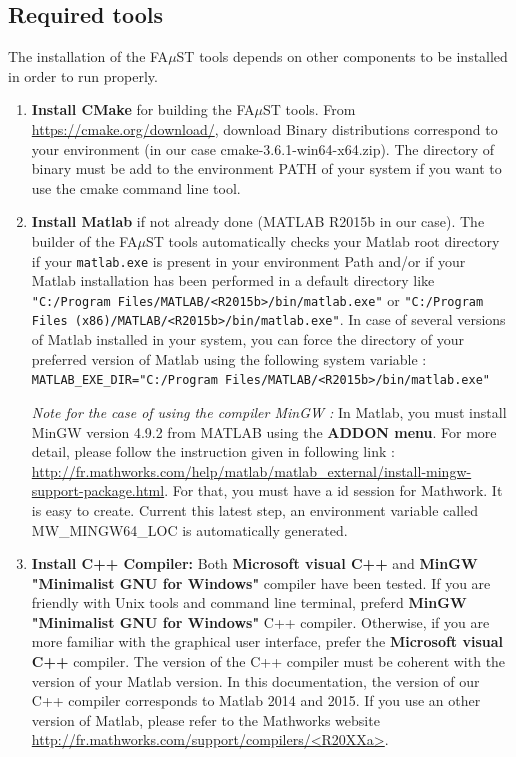 \subsection{Required tools}\label{sec:WinRequired}
The installation of the FA$\mu$ST tools depends on other components to be installed in order to run properly. 
\begin{enumerate}

\item \textbf{Install CMake} for building the FA$\mu$ST tools. 
From \url{https://cmake.org/download/}, download Binary distributions correspond to your environment (in our case  cmake-3.6.1-win64-x64.zip). The directory of binary must be add to the environment PATH of your system if you want to use the cmake command line tool. 


\item \textbf{Install Matlab} if not already done (MATLAB R2015b in our case). The builder of the FA$\mu$ST tools automatically checks your Matlab root directory if your \texttt{matlab.exe} is present in your environment Path and/or if your Matlab installation has been performed in a default directory like \texttt{"C:/Program Files/MATLAB/<R2015b>/bin/matlab.exe"} or \texttt{"C:/Program Files (x86)/MATLAB/<R2015b>/bin/matlab.exe"}. In case of several versions of Matlab installed in your system, you can force the directory of your preferred version of Matlab using the following system variable : \\
\texttt{MATLAB\_EXE\_DIR="C:/Program Files/MATLAB/<R2015b>/bin/matlab.exe"}

\textit{Note for the case of using the compiler MinGW :} In Matlab, you must install MinGW version 4.9.2 from MATLAB using the \textbf{ADDON menu}. For more detail, please follow the instruction given in following link :  
\url{http://fr.mathworks.com/help/matlab/matlab_external/install-mingw-support-package.html}. For that, you must have a id session for Mathwork. It is easy to create. 
Current this latest step, an environment variable called MW\_MINGW64\_LOC is automatically generated. 

\item \textbf{Install C++ Compiler:} Both \textbf{Microsoft visual C++} and \textbf{MinGW "Minimalist GNU for Windows"} compiler have been tested. If you are friendly with Unix tools and command line terminal, preferd \textbf{MinGW "Minimalist GNU for Windows"} C++ compiler. Otherwise, if you are more familiar with the graphical user interface, prefer the \textbf{Microsoft visual C++} compiler. The version of the C++ compiler must be coherent with the version of your Matlab version. In this documentation, the version of our C++ compiler corresponds to Matlab 2014 and 2015. If you use an other version of Matlab, please refer to the Mathworks website \url{http://fr.mathworks.com/support/compilers/<R20XXa>}.


\end{enumerate}
